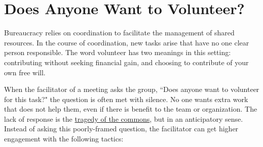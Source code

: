\section{Does Anyone Want to Volunteer?}

Bureaucracy relies on coordination to facilitate the management of shared resources. In the course of coordination, new tasks arise that have no one clear person responsible. The word volunteer has two meanings in this setting: contributing without seeking financial gain, and choosing to contribute of your own free will. 


When the facilitator of a meeting asks the group, ``Does anyone want to volunteer for this task?" the question is often met with silence. No one wants extra work that does not help them, even if there is benefit to the team or organization. 
The lack of response is the \href{https://en.wikipedia.org/wiki/Tragedy_of_the_commons}{tragedy of the commons}, 
but in an anticipatory sense.
Instead of asking this poorly-framed question, the facilitator can get higher engagement with the following tactics:
